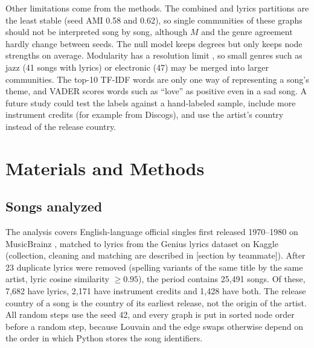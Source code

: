 Other limitations come from the methods. The combined and lyrics partitions are the least stable (seed AMI 0.58 and 0.62), so single communities of these graphs should not be interpreted song by song, although $M$ and the genre agreement hardly change between seeds. The null model keeps degrees but only keeps node strengths on average. Modularity has a resolution limit \cite{TODO_fortunato2007resolution}, so small genres such as jazz (41 songs with lyrics) or electronic (47) may be merged into larger communities. The top-10 TF-IDF words are only one way of representing a song's theme, and VADER scores words such as ``love'' as positive even in a sad song. A future study could test the labels against a hand-labeled sample, include more instrument credits (for example from Discogs), and use the artist's country instead of the release country.


\section*{Materials and Methods}

\subsection*{Songs analyzed}
The analysis covers English-language official singles first released 1970--1980 on MusicBrainz \cite{TODO_musicbrainz}, matched to lyrics from the Genius lyrics dataset on Kaggle \cite{TODO_genius_kaggle} (collection, cleaning and matching are described in [section by teammate]). After 23 duplicate lyrics were removed (spelling variants of the same title by the same artist, lyric cosine similarity $\geq 0.95$), the period contains 25,491 songs. Of these, 7,682 have lyrics, 2,171 have instrument credits and 1,428 have both. The release country of a song is the country of its earliest release, not the origin of the artist. All random steps use the seed 42, and every graph is put in sorted node order before a random step, because Louvain and the edge swaps otherwise depend on the order in which Python stores the song identifiers.

